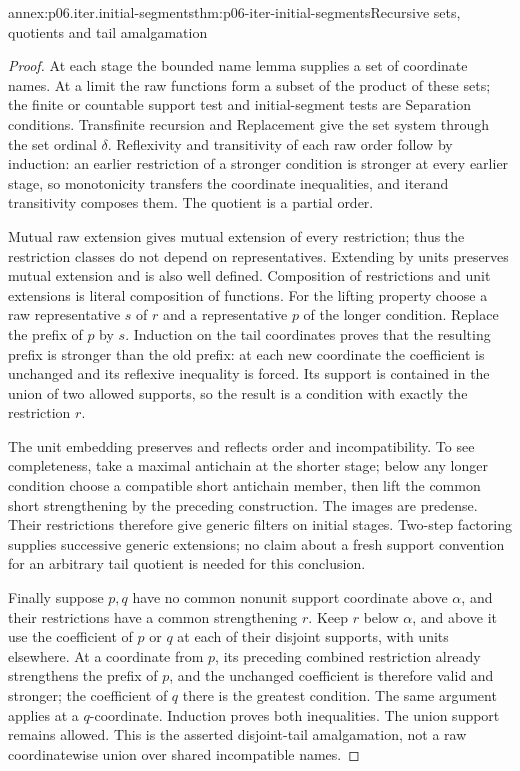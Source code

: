 \begin{annexitem}{annex:p06.iter.initial-segments}{thm:p06-iter-initial-segments}{Recursive sets, quotients and tail amalgamation}
\begin{proof}
At each stage the bounded name lemma supplies a set of coordinate names.
At a limit the raw functions form a subset of the product of these sets;
the finite or countable support test and initial-segment tests are
Separation conditions. Transfinite recursion and Replacement give the
set system through the set ordinal \(\delta\).
Reflexivity and transitivity of each raw order follow by induction:
an earlier restriction of a stronger condition is stronger at every
earlier stage, so monotonicity transfers the coordinate inequalities,
and iterand transitivity composes them. The quotient is a partial order.

Mutual raw extension gives mutual extension of every restriction; thus
the restriction classes do not depend on representatives. Extending by
units preserves mutual extension and is also well defined. Composition
of restrictions and unit extensions is literal composition of functions.
For the lifting property choose a raw representative \(s\) of \(r\)
and a representative \(p\) of the longer condition. Replace the prefix
of \(p\) by \(s\). Induction on the tail coordinates proves that
the resulting prefix is stronger than the old prefix: at each new
coordinate the coefficient is unchanged and its reflexive inequality
is forced. Its support is contained in the union of two allowed
supports, so the result is a condition with exactly the restriction \(r\).

The unit embedding preserves and reflects order and incompatibility.
To see completeness, take a maximal antichain at the shorter stage;
below any longer condition choose a compatible short antichain member,
then lift the common short strengthening by the preceding construction.
The images are predense. Their restrictions therefore give generic
filters on initial stages. Two-step factoring supplies successive
generic extensions; no claim about a fresh support convention for an
arbitrary tail quotient is needed for this conclusion.

Finally suppose \(p,q\) have no common nonunit support coordinate
above \(\alpha\), and their restrictions have a common strengthening
\(r\). Keep \(r\) below \(\alpha\), and above it use the coefficient
of \(p\) or \(q\) at each of their disjoint supports, with units
elsewhere. At a coordinate from \(p\), its preceding combined restriction
already strengthens the prefix of \(p\), and the unchanged coefficient
is therefore valid and stronger; the coefficient of \(q\) there is
the greatest condition. The same argument applies at a \(q\)-coordinate.
Induction proves both inequalities. The union support remains allowed.
This is the asserted disjoint-tail amalgamation, not a raw coordinatewise
union over shared incompatible names.
\end{proof}
\end{annexitem}

